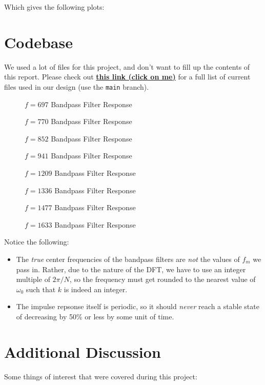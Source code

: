 \documentclass[12pt]{article}
\newcommand{\magphaseplot}[1]{
    \begin{figure}[H]
        \centering 
        
        \caption{$f = #1$ Bandpass Filter Response}
        \label{fig:f=#1}
    \end{figure}
}
\begin{document}
\inputminted{matlab}{calc.m}

Which gives the following plots:

\section*{Codebase}

We used a lot of files for this project, and don't want to 
fill up the contents of this report. Please check out 
\href{https://github.com/BrianMere/CPE367FinalProject.git}{\textbf{this link (click
on me)}}
for a full list of current files used in our design (use the 
\texttt{main} branch).

\magphaseplot{697}
\magphaseplot{770}
\magphaseplot{852}
\magphaseplot{941}

\magphaseplot{1209}
\magphaseplot{1336}
\magphaseplot{1477}
\magphaseplot{1633}

Notice the following:

\begin{itemize}
    \item The \textit{true} center frequencies of the bandpass filters 
    are \textit{not} the values of $f_m$ we pass in. Rather, due to the 
    nature of the DFT, we have to use an integer multiple of $2\pi/N$, so 
    the frequency must get rounded to the nearest value of $\omega_0$ such that 
    $k$ is indeed an integer.
    \item The impulse repsonse itself is periodic, so it should 
    \textit{never} reach a stable state of decreasing by 50\% or less 
    by some unit of time.  
\end{itemize}




\section*{Additional Discussion}

Some things of interest that were covered during this project:
\end{document}
